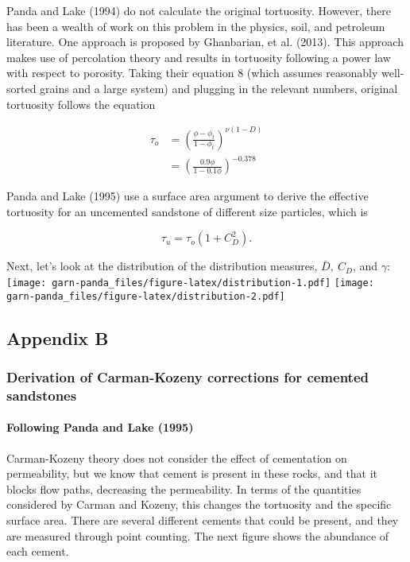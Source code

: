 \documentclass[]{article}
\let\oldparagraph\paragraph
\renewcommand{\paragraph}[1]{\oldparagraph{#1}\mbox{}}
\begin{document}
Panda and Lake (1994) do not calculate the original tortuosity. However,
there has been a wealth of work on this problem in the physics, soil,
and petroleum literature. One approach is proposed by Ghanbarian, et al.
(2013). This approach makes use of percolation theory and results in
tortuosity following a power law with respect to porosity. Taking their
equation 8 (which assumes reasonably well-sorted grains and a large
system) and plugging in the relevant numbers, original tortuosity
follows the equation

\begin{align}
\tau_o &= \left(\frac{\phi - \phi_t}{1 - \phi_t} \right)^{\nu(1-D)} \\
 &= \left(\frac{0.9\phi}{1-0.1\phi} \right)^{-0.378}
\end{align}

Panda and Lake (1995) use a surface area argument to derive the
effective tortuosity for an uncemented sandstone of different size
particles, which is

\begin{equation}
\tau_u = \tau_o \left(1 + C_D^2 \right).
\end{equation}

Next, let's look at the distribution of the distribution measures,
\(\bar D,\ C_D\), and \(\gamma\):
\texttt{[image: garn-panda\_files/figure-latex/distribution-1.pdf]}
\texttt{[image: garn-panda\_files/figure-latex/distribution-2.pdf]}

\subsection{Appendix B}\label{appendix-b}

\subsubsection{Derivation of Carman-Kozeny corrections for cemented
sandstones}\label{derivation-of-carman-kozeny-corrections-for-cemented-sandstones}

\paragraph{Following Panda and Lake
(1995)}\label{following-panda-and-lake-1995}

Carman-Kozeny theory does not consider the effect of cementation on
permeability, but we know that cement is present in these rocks, and
that it blocks flow paths, decreasing the permeability. In terms of the
quantities considered by Carman and Kozeny, this changes the tortuosity
and the specific surface area. There are several different cements that
could be present, and they are measured through point counting. The next
figure shows the abundance of each cement.
\end{document}

